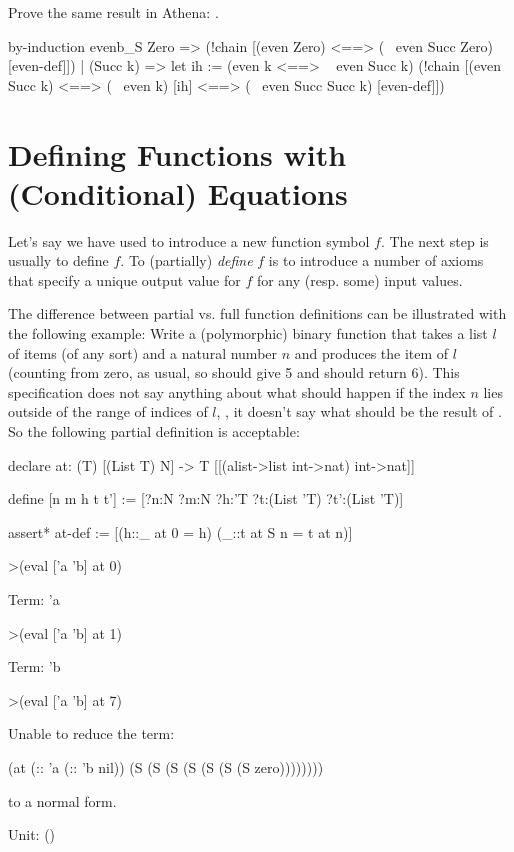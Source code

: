 \begin{exercise}[subtitle={Foo Bar}]
Prove the same result in Athena: . 
\end{exercise}
\begin{solution}[print=true]
\begin{tcAthena}
  by-induction evenb_S {
    Zero => (!chain [(even Zero) 
                <==> (~ even Succ Zero)                   [even-def]])
  | (Succ k) => let {ih := (even k <==> ~ even Succ k)}
                  (!chain [(even Succ k)
                      <==> (~ even k)                     [ih]
                      <==> (~ even Succ Succ k)           [even-def]])
  }
\end{tcAthena}
\end{solution}




\section{Defining Functions with (Conditional) Equations}

Let's say we have used  to introduce
a new function symbol $f$. The next step 
is usually to define $f$. To (partially) 
{\em define\/}  $f$ is to introduce a number of axioms that specify a 
unique output value for $f$ for  any (resp. some) 
input values.

The difference between partial vs. full function definitions
can be illustrated with the following example: Write a (polymorphic)
binary function  that takes a list $l$ of items (of any sort) and a natural
number $n$ and produces the  item of $l$ (counting from zero, as usual, so
 should give 5 and  should return 6).
This specification does not say anything about what should happen if the index $n$
lies outside of the range of indices of $l$, \egnsp, it doesn't say what should be
the result of . So the following partial definition is acceptable:
\begin{tcAthena}
declare at: (T) [(List T) N] -> T [[(alist->list int->nat) int->nat]]

define [n m h t t'] := [?n:N ?m:N ?h:'T ?t:(List 'T) ?t':(List 'T)]

assert* at-def := [(h::_ at 0 = h)
                   (_::t at S n = t at n)]

>(eval ['a 'b] at 0)

Term: 'a

>(eval ['a 'b] at 1)

Term: 'b

>(eval ['a 'b] at 7)

Unable to reduce the term:
 
(at (:: 'a
        (:: 'b
            nil))
    (S (S (S (S (S (S (S zero))))))))
 
to a normal form.

Unit: ()
\end{tcAthena}

